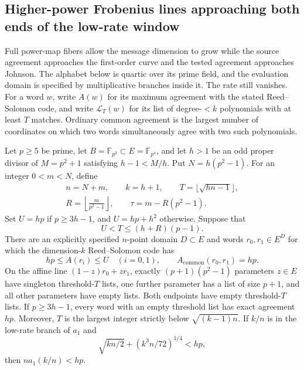 \subsection{Higher-power Frobenius lines approaching both ends of the low-rate window}
\label{sec:higher-power-frobenius}

Full power-map fibers allow the message dimension to grow while the
source agreement approaches the first-order curve and the tested
agreement approaches Johnson. The alphabet below is quartic over its
prime field, and the evaluation domain is specified by multiplicative branches inside it.
The rate still vanishes. For a word $w$, write $A(w)$ for its maximum
agreement with the stated Reed--Solomon code, and write
$\mathcal L_T(w)$ for its list of degree-$<k$ polynomials with at least
$T$ matches. Ordinary common agreement is the largest number of
coordinates on which two words simultaneously agree with two such
polynomials.



\begin{proposition}
\label{prop:higher-power-frobenius-finite}
Let $p\ge5$ be prime, let $B=\mathbb F_{p^2}\subset E=\mathbb F_{p^4}$,
and let $h>1$ be an odd proper divisor of $M=p^2+1$ satisfying
$h-1<M/h$. Put $N=h(p^2-1)$. For an integer $0<m<N$, define
\[
 \begin{gathered}
 n=N+m,\qquad k=h+1,\qquad T=\lfloor\sqrt{hn-1}\rfloor,\\
 R=\left\lfloor\frac{m}{p^2-1}\right\rfloor,\qquad
 \tau=m-R(p^2-1).
 \end{gathered}
\]
Set $U=hp$ if $p\ge3h-1$, and $U=hp+h^2$ otherwise. Suppose that
\begin{equation}\label{eq:higher-power-finite-guards}
 U<T\le(h+R)(p-1).
\end{equation}
There are an explicitly specified $n$-point domain $D\subset E$ and words $r_0,r_1\in E^D$
for which the dimension-$k$ Reed--Solomon code has
\[
 hp\le A(r_i)\le U\quad(i=0,1),\qquad
 A_{\mathrm{common}}(r_0,r_1)=hp.
\]
On the affine line $(1-z)r_0+zr_1$, exactly $(p+1)(p^2-1)$ parameters
$z\in E$ have singleton threshold-$T$ lists, one further parameter has
a list of size $p+1$, and all other parameters have empty lists.
Both endpoints have empty threshold-$T$ lists. If $p\ge3h-1$, every
word with an empty threshold list has exact agreement $hp$. Moreover, $T$ is the
largest integer strictly below $\sqrt{(k-1)n}$. If $k/n$ is in the
low-rate branch of $a_1$ and
\begin{equation}\label{eq:higher-power-first-order-guard}
 \sqrt{kn/2}+(k^3n/72)^{1/4}<hp,
\end{equation}
then $n a_1(k/n)<hp$.
\end{proposition}

